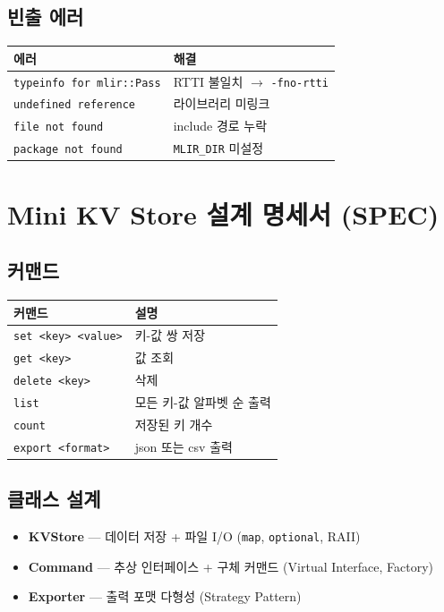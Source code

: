 \documentclass[11pt,a4paper]{article}
\begin{document}
\subsection{빈출 에러}
\begin{longtable}{p{6cm}p{7cm}}
\toprule
에러 & 해결 \\
\midrule
\texttt{typeinfo for mlir::Pass} & RTTI 불일치 $\to$ \texttt{-fno-rtti} \\
\texttt{undefined reference} & 라이브러리 미링크 \\
\texttt{file not found} & include 경로 누락 \\
\texttt{package not found} & \texttt{MLIR\_DIR} 미설정 \\
\bottomrule
\end{longtable}

\newpage

\section{Mini KV Store 설계 명세서 (SPEC)}

\subsection{커맨드}
\begin{longtable}{p{4cm}p{9cm}}
\toprule
커맨드 & 설명 \\
\midrule
\texttt{set <key> <value>} & 키-값 쌍 저장 \\
\texttt{get <key>} & 값 조회 \\
\texttt{delete <key>} & 삭제 \\
\texttt{list} & 모든 키-값 알파벳 순 출력 \\
\texttt{count} & 저장된 키 개수 \\
\texttt{export <format>} & json 또는 csv 출력 \\
\bottomrule
\end{longtable}

\subsection{클래스 설계}
\begin{itemize}[nosep]
\item \textbf{KVStore} --- 데이터 저장 + 파일 I/O (\texttt{map}, \texttt{optional}, RAII)
\item \textbf{Command} --- 추상 인터페이스 + 구체 커맨드 (Virtual Interface, Factory)
\item \textbf{Exporter} --- 출력 포맷 다형성 (Strategy Pattern)
\end{itemize}
\end{document}
